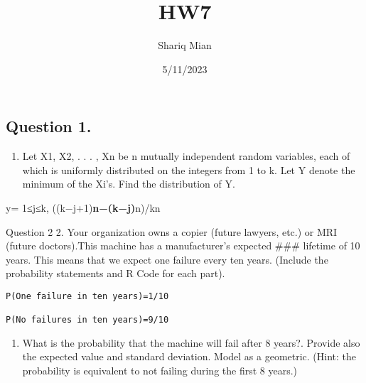\documentclass[
]{article}
\title{HW7}
\author{Shariq Mian}
\date{5/11/2023}
\providecommand{\tightlist}{%
  \setlength{\itemsep}{0pt}\setlength{\parskip}{0pt}}
\begin{document}
\maketitle

\hypertarget{question-1.}{%
\subsection{Question 1.}\label{question-1.}}

\begin{enumerate}
\def\labelenumi{\arabic{enumi}.}
\tightlist
\item
  Let X1, X2, . . . , Xn be n mutually independent random variables,
  each of which is uniformly distributed on the integers from 1 to k.
  Let Y denote the minimum of the Xi's. Find the distribution of Y.
\end{enumerate}

y= 1≤j≤k, ((k−j+1)\textbf{n−(k−j)}n)/kn

Question 2 2. Your organization owns a copier (future lawyers, etc.) or
MRI (future doctors).This machine has a manufacturer's expected \#\#\#
lifetime of 10 years. This means that we expect one failure every ten
years. (Include the probability statements and R Code for each part).

\begin{verbatim}
P(One failure in ten years)=1/10

P(No failures in ten years)=9/10
\end{verbatim}

\begin{enumerate}
\def\labelenumi{\alph{enumi}.}
\tightlist
\item
  What is the probability that the machine will fail after 8 years?.
  Provide also the expected value and standard deviation. Model as a
  geometric. (Hint: the probability is equivalent to not failing during
  the first 8 years.)
\end{enumerate}
\end{document}
